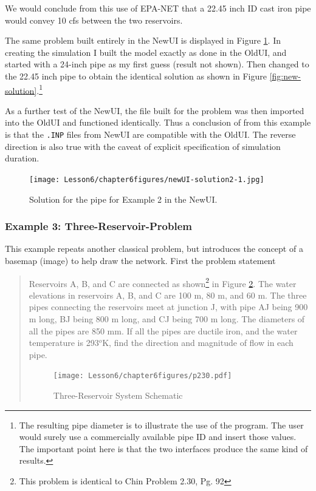 We would conclude from this use of EPA-NET that a 22.45 inch ID cast iron pipe would convey 10 cfs between the two reservoirs. 

The same problem built entirely in the NewUI is displayed in Figure \ref{fig:new-solution2-1}.  
In creating the simulation I built the model exactly as done in the OldUI, and started with a 24-inch pipe as my first guess (result not shown).   Then changed to the 22.45 inch pipe to obtain the identical solution as shown in Figure \ref{fig:new-solution}.\footnote{The resulting pipe diameter is to illustrate the use of the program.  The user would surely use a commercially available pipe ID and insert those values.  The important point here is that the two interfaces produce the same kind of results.}

\newpage As a further test of the NewUI, the file built for the problem was then imported into the OldUI and functioned identically.  
Thus a conclusion of from this example is that the \texttt{.INP} files from NewUI are compatible with the OldUI.   
The reverse direction is also true with the caveat of explicit specification of simulation duration.

\begin{figure}[h!] %
   \centering
   \texttt{[image: Lesson6/chapter6figures/newUI-solution2-1.jpg]} 
   \caption{Solution for the pipe for Example 2 in the NewUI.}
   \label{fig:new-solution2-1}
\end{figure}
\clearpage

\subsubsection{Example 3: Three-Reservoir-Problem}
This example repeats another classical problem, but introduces the concept of a basemap (image) to help draw the network. 
First the problem statement

\begin{quote}
Reservoirs A, B, and C are connected as shown\footnote{This problem is identical to Chin Problem 2.30, Pg. 92} in Figure \ref{fig:p230}.  The water elevations in reservoirs A, B, and C are 100 m, 80 m, and 60 m.   The three pipes connecting the reservoirs meet at junction J, with pipe AJ being 900 m long, BJ being 800 m long, and CJ being 700 m long.  The diameters of all the pipes are
850 mm.  If all the pipes are ductile iron, and the water temperature is 293$^o$K, find the direction and magnitude of flow in each pipe.

\begin{figure}[htbp] %
   \centering
   \texttt{[image: Lesson6/chapter6figures/p230.pdf]} 
   \caption{Three-Reservoir System Schematic}
   \label{fig:p230}
\end{figure}
\end{quote}


